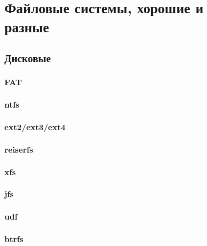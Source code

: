 \chapter{Файловые системы, хорошие и разные}
\section{Дисковые}
\subsection{FAT}
\subsection{ntfs}
\subsection{ext2/ext3/ext4}
\subsection{reiserfs}
\subsection{xfs}
\subsection{jfs}
\subsection{udf}
\subsection{btrfs}
